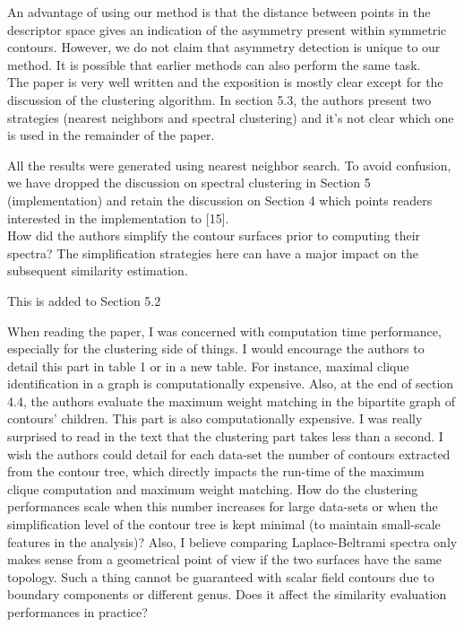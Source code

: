 \documentclass[10pt]{article}
\begin{document}
   {\color{blue}An advantage of using our method is that the distance between
	   points in the descriptor space gives an indication of the asymmetry
	   present within symmetric contours. However, we do not claim that
	   asymmetry detection is unique to our method. It is possible that
   earlier methods can also perform the same task.}\\

The paper is very well written and the exposition is mostly clear except
   for the discussion of the clustering algorithm. In section 5.3, the
   authors present two strategies (nearest neighbors and spectral
   clustering) and it's not clear which one is used in the remainder of the
   paper.

   {\color{blue}All the results were generated using nearest neighbor search.
	   To avoid confusion, we have dropped the discussion on spectral
	   clustering in Section 5 (implementation) and retain the discussion
	   on Section 4 which points readers interested in the implementation
   to [15].}\\
   
   How did the authors simplify the contour surfaces prior to computing
   their spectra? The simplification strategies here can have a major impact
   on the subsequent similarity estimation.

   {\color{blue}This is added to Section 5.2}

   When reading the paper, I was concerned with computation time
   performance, especially for the clustering side of things. I would
   encourage the authors to detail this part in table 1 or in a new table.
   For instance, maximal clique identification in a graph is computationally
   expensive. Also, at the end of section 4.4, the authors evaluate the
   maximum weight matching in the bipartite graph of contours' children.
   This part is also computationally expensive. I was really surprised to
   read in the text that the clustering part takes less than a 
   second. I wish the authors could detail for each data-set the number of 
   contours extracted from the contour tree, which directly impacts the
   run-time of the maximum clique computation and maximum weight matching.
   How do the clustering performances scale when this number increases for
   large data-sets or when the simplification level of the contour tree is
   kept minimal (to maintain small-scale features in the analysis)?
   Also, I believe comparing Laplace-Beltrami spectra only makes sense from
   a geometrical point of view if the two surfaces have the same topology.
   Such a thing cannot be guaranteed with scalar field contours due to
   boundary components or different genus. Does it affect the similarity
   evaluation performances in practice?
\end{document}
